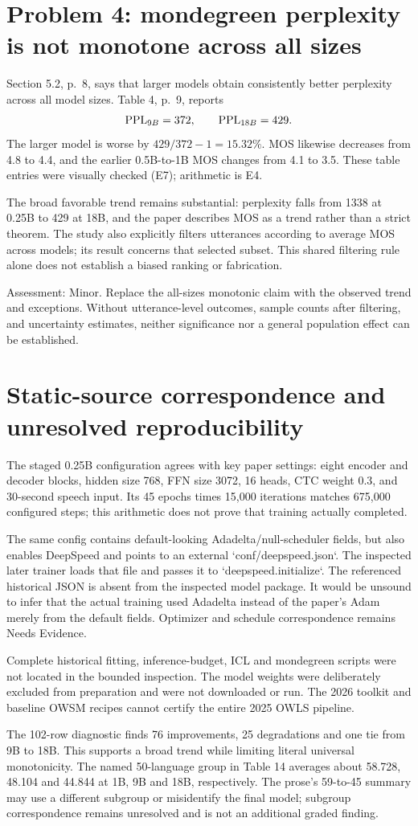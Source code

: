 \documentclass[10pt]{article}
\begin{document}
\section*{Problem 4: mondegreen perplexity is not monotone across all sizes}
Section 5.2, p. 8, says that larger models obtain consistently better perplexity across all model sizes. Table 4, p. 9, reports \[{\rm PPL}_{9B}=372,\qquad {\rm PPL}_{18B}=429.\] The larger model is worse by \(429/372-1=15.32\%\). MOS likewise decreases from 4.8 to 4.4, and the earlier 0.5B-to-1B MOS changes from 4.1 to 3.5. These table entries were visually checked (E7); arithmetic is E4.\par
The broad favorable trend remains substantial: perplexity falls from 1338 at 0.25B to 429 at 18B, and the paper describes MOS as a trend rather than a strict theorem. The study also explicitly filters utterances according to average MOS across models; its result concerns that selected subset. This shared filtering rule alone does not establish a biased ranking or fabrication.\par
Assessment: Minor. Replace the all-sizes monotonic claim with the observed trend and exceptions. Without utterance-level outcomes, sample counts after filtering, and uncertainty estimates, neither significance nor a general population effect can be established.\par
\section*{Static-source correspondence and unresolved reproducibility}
The staged 0.25B configuration agrees with key paper settings: eight encoder and decoder blocks, hidden size 768, FFN size 3072, 16 heads, CTC weight 0.3, and 30-second speech input. Its 45 epochs times 15,000 iterations matches 675,000 configured steps; this arithmetic does not prove that training actually completed.\par
The same config contains default-looking Adadelta/null-scheduler fields, but also enables DeepSpeed and points to an external `conf/deepspeed.json`. The inspected later trainer loads that file and passes it to `deepspeed.initialize`. The referenced historical JSON is absent from the inspected model package. It would be unsound to infer that the actual training used Adadelta instead of the paper’s Adam merely from the default fields. Optimizer and schedule correspondence remains Needs Evidence.\par
Complete historical fitting, inference-budget, ICL and mondegreen scripts were not located in the bounded inspection. The model weights were deliberately excluded from preparation and were not downloaded or run. The 2026 toolkit and baseline OWSM recipes cannot certify the entire 2025 OWLS pipeline.\par
The 102-row diagnostic finds 76 improvements, 25 degradations and one tie from 9B to 18B. This supports a broad trend while limiting literal universal monotonicity. The named 50-language group in Table 14 averages about 58.728, 48.104 and 44.844 at 1B, 9B and 18B, respectively. The prose’s 59-to-45 summary may use a different subgroup or misidentify the final model; subgroup correspondence remains unresolved and is not an additional graded finding.\par
\end{document}
